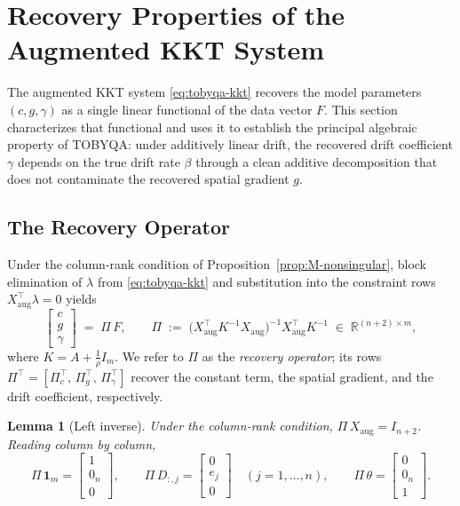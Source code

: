 \documentclass[11pt,a4paper]{article}
\newcommand{\R}{\mathbb{R}}
\newtheorem{lemma}[theorem]{Lemma}
\begin{document}
\section{Recovery Properties of the Augmented KKT System}
\label{sec:theory}

The augmented KKT system \eqref{eq:tobyqa-kkt} recovers the model
parameters $(c, g, \gamma)$ as a single linear functional of the
data vector $F$. This section characterizes that functional and
uses it to establish the principal algebraic property of TOBYQA:
under additively linear drift, the recovered drift coefficient
$\gamma$ depends on the true drift rate $\beta$ through a clean
additive decomposition that does not contaminate the recovered
spatial gradient $g$.

\subsection{The Recovery Operator}
\label{sec:recovery-operator}

Under the column-rank condition of
Proposition~\ref{prop:M-nonsingular}, block elimination of
$\lambda$ from \eqref{eq:tobyqa-kkt} and substitution into the
constraint rows $X_{\mathrm{aug}}^\top \lambda = 0$ yields
\begin{equation}\label{eq:recovery-op}
  \begin{bmatrix} c \\ g \\ \gamma \end{bmatrix}
  \;=\;
  \Pi\,F,
  \qquad
  \Pi \;:=\;
  \bigl(X_{\mathrm{aug}}^{\!\top} K^{-1} X_{\mathrm{aug}}\bigr)^{-1}
  X_{\mathrm{aug}}^{\!\top} K^{-1}
  \;\in\; \R^{(n+2)\times m},
\end{equation}
where $K = A + \tfrac{1}{\rho}I_m$. We refer to $\Pi$ as the
\emph{recovery operator}; its rows
$\Pi^\top = [\Pi_c^\top,\,\Pi_g^\top,\,\Pi_\gamma^\top]$
recover the constant term, the spatial gradient, and the drift
coefficient, respectively.

\begin{lemma}[Left inverse]\label{lem:pi-leftinv}
Under the column-rank condition, $\Pi\,X_{\mathrm{aug}} = I_{n+2}$.
Reading column by column,
\begin{equation}\label{eq:pi-on-columns}
  \Pi\,\mathbf{1}_m =
    \begin{bmatrix} 1 \\ 0_n \\ 0 \end{bmatrix},
  \qquad
  \Pi\,D_{:,j} =
    \begin{bmatrix} 0 \\ e_j \\ 0 \end{bmatrix}
    \quad (j = 1,\dots,n),
  \qquad
  \Pi\,\theta =
    \begin{bmatrix} 0 \\ 0_n \\ 1 \end{bmatrix}.
\end{equation}
\end{lemma}
\end{document}
